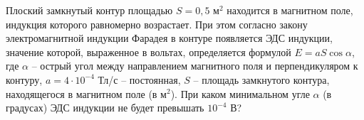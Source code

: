 \begin{ex}
	\begin{condition}
		Плоский замкнутый контур площадью \( S = 0,5 \) м\( ^2 \) находится в магнитном поле, индукция которого равномерно возрастает. При этом согласно закону электромагнитной индукции Фарадея в контуре появляется ЭДС индукции, значение которой, выраженное в вольтах, определяется формулой \( E = aS\cos\alpha \), где  \( \alpha \) – острый угол между направлением магнитного поля и перпендикуляром к контуру, \(  a=4\cdot10^{-4}\) Тл/с – постоянная, \( S \) – площадь замкнутого контура, находящегося в магнитном поле (в м\( ^2 \)). При каком минимальном угле \( \alpha \) (в градусах) ЭДС индукции не будет превышать \( 10^{-4} \) В?
	\end{condition}
	\answer{\( 60\degree \)}
\end{ex}